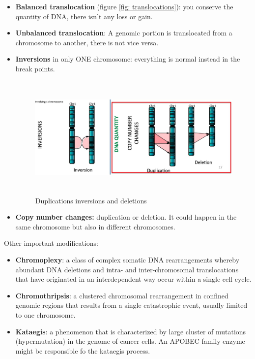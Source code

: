 \begin{itemize}
  \item \textbf{Balanced translocation} (figure \ref{fig: translocations}): you conserve the quantity of DNA, there
  isn't any loss or gain.
  
  \item \textbf{Unbalanced translocation}: A genomic portion is translocated
  from a chromosome to another, there is not vice versa.
  
  \item \textbf{Inversions} in only ONE chromosome: everything is normal instead
  in the break points.

  \begin{figure}[H]
    \includegraphics[width=6.22722in,height=2.39062in]{image7.jpeg}
    \centering
    \caption{Duplications inversions and deletions}
    \label{fig: Duplications inversions and deletions}
  \end{figure}

  \item \textbf{Copy number changes:} duplication or deletion. It could happen in
  the same chromosome but also in different chromosomes.
\end{itemize}

Other important modifications:

\begin{itemize}
  \item \textbf{Chromoplexy}: a class of complex somatic DNA rearrangements
  whereby abundant DNA deletions and intra- and inter-chromosomal translocations
  that have originated in an interdependent way occur within a single cell
  cycle.

  \item \textbf{Chromothripsis}: a clustered chromosomal rearrangement in
  confined genomic regions that results from a single catastrophic event,
  usually limited to one chromosome.

  \item \textbf{Kataegis}: a phenomenon that is characterized by large cluster
  of mutations (hypermutation) in the genome of cancer cells. An APOBEC family
  enzyme might be responsible fo the kataegis process.
\end{itemize}
  
